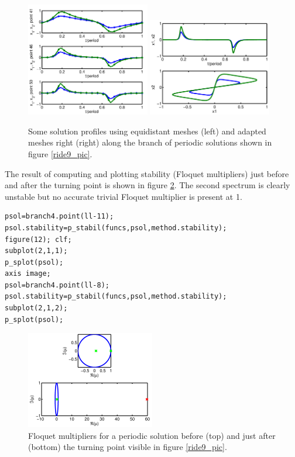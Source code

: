 \documentclass[10pt]{scrartcl}
\begin{document}
\begin{figure}[h]
\begin{center}
\includegraphics[width=0.48\textwidth]{fig/demo1fig10}
\includegraphics[width=0.48\textwidth]{fig/demo1fig13}
\end{center}
\caption{\label{ride10+13_pic}Some solution profiles
using equidistant meshes (left) and adapted meshes right (right) 
along the branch of periodic solutions 
shown in figure \ref{ride9_pic}.} 
\end{figure}
The result of computing and plotting stability (Floquet multipliers) 
just before
and after the turning point is shown in figure \ref{ride12_pic}. 
The second spectrum is clearly unstable but no accurate trivial
Floquet multiplier is present at 1. 
\begin{lstlisting}
psol=branch4.point(ll-11);
psol.stability=p_stabil(funcs,psol,method.stability);
figure(12); clf;
subplot(2,1,1);
p_splot(psol);
axis image;
psol=branch4.point(ll-8);
psol.stability=p_stabil(funcs,psol,method.stability);
subplot(2,1,2);
p_splot(psol);  
\end{lstlisting}
\begin{figure}[h]
\begin{center}
  \includegraphics[width=0.5\textwidth]{fig/demo1fig12}
\end{center}
\caption{\label{ride12_pic}Floquet multipliers for
a periodic solution before (top) and just after (bottom)
the turning point visible in figure \ref{ride9_pic}.}
\end{figure}
\end{document}
